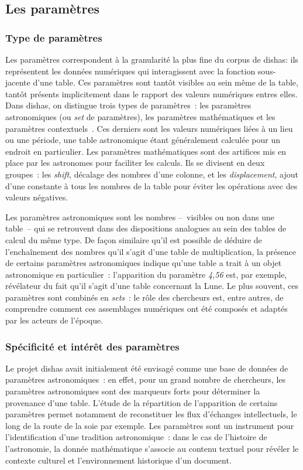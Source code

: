 \documentclass[a4paper,12pt,twoside]{book}
\newcommand{\eng}{\emph}
\newcommand{\g}[1]{\og#1~\fg}
\newcommand{\dishas}{\gls{dishas}\xspace}
\begin{document}
		\subsection{Les paramètres}
			\subsubsection{Type de paramètres}
Les paramètres correspondent à la granularité la plus fine du corpus de \dishas: ils représentent les données numériques qui interagissent avec la fonction sous-jacente d'une table. Ces paramètres sont tantôt visibles au sein même de la table, tantôt présents implicitement dans le rapport des valeurs numériques entres elles. Dans \dishas, on distingue trois types de paramètres~: les paramètres astronomiques (ou \eng{set} de paramètres), les paramètres mathématiques et les paramètres \g{contextuels}. Ces derniers sont les valeurs numériques liées à un lieu ou une période, une table astronomique étant généralement calculée pour un endroit en particulier. Les paramètres mathématiques sont des artifices mis en place par les astronomes pour faciliter les calculs. Ils se divisent en deux groupes~: les \eng{shift}, décalage des nombres d'une colonne, et les \eng{displacement}, ajout d'une constante à tous les nombres de la table pour éviter les opérations avec des valeurs négatives.

Les paramètres astronomiques sont les nombres –~visibles ou non dans une table~– qui se retrouvent dans des dispositions analogues au sein des tables de calcul du même type. De façon similaire qu'il est possible de déduire de l'enchaînement des nombres qu'il s'agit d'une table de multiplication, la présence de certains paramètres astronomiques indique qu'une table a trait à un objet astronomique en particulier~: l'apparition du paramètre \emph{4,56} est, par exemple, révélateur du fait qu'il s'agit d'une table concernant la Lune. Le plus souvent, ces paramètres sont combinés en \eng{sets}~: le rôle des chercheurs est, entre autres, de comprendre comment ces assemblages numériques ont été composés et adaptés par les acteurs de l'époque.

			\subsubsection{Spécificité et intérêt des paramètres}
Le projet \dishas avait initialement été envisagé comme une base de données de paramètres astronomiques~: en effet, pour un grand nombre de chercheurs, les paramètres astronomiques sont des marqueurs forts pour déterminer la provenance d’une table. L’étude de la répartition de l’apparition de certains paramètres permet notamment de reconstituer les flux d’échanges intellectuels, le long de la route de la soie par exemple. Les paramètres sont un instrument pour l'identification d'une tradition astronomique~: dans le cas de l'histoire de l'astronomie, la donnée mathématique s'associe au contenu textuel pour révéler le contexte culturel et l'environnement historique d'un document.
\end{document}
